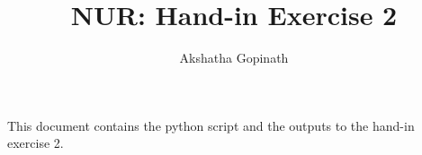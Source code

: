 \documentclass[a4paper,10pt]{article}
\title{NUR: Hand-in Exercise 2}
\author{Akshatha Gopinath}
\begin{document}
\maketitle

This document contains the python script and the outputs to the hand-in exercise 2.














\end{document}
